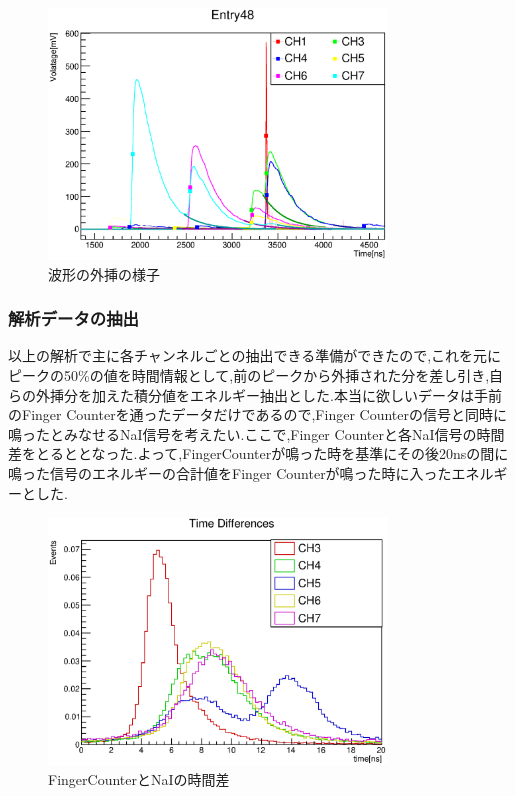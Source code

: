 \begin{figure}[bht]
  \centering
  \includegraphics[width=0.8\textwidth]{figure/hatano/analysis.eps}
  \caption{波形の外挿の様子}
  \label{hatano_fig:analysis}
\end{figure}

\subsubsection{解析データの抽出}
以上の解析で主に各チャンネルごとの抽出できる準備ができたので,これを元にピークの50\%の値を時間情報として,前のピークから外挿された分を差し引き,自らの外挿分を加えた積分値をエネルギー抽出とした.本当に欲しいデータは手前のFinger Counterを通ったデータだけであるので,Finger Counterの信号と同時に鳴ったとみなせるNaI信号を考えたい.ここで,Finger Counterと各NaI信号の時間差をとるととなった.よって,FingerCounterが鳴った時を基準にその後20nsの間に鳴った信号のエネルギーの合計値をFinger Counterが鳴った時に入ったエネルギーとした.

\begin{figure}[bht]
  \centering
  \includegraphics[width=0.8\textwidth]{figure/hatano/coincidence.eps}
  \caption{FingerCounterとNaIの時間差}
  \label{hatano_fig:coincidence}
\end{figure}

